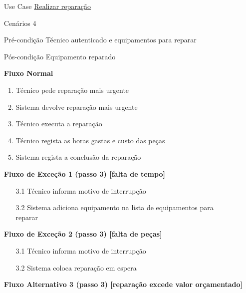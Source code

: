 \documentclass[../relatorio.tex]{subfiles}
\begin{document}
\begin{itemize}
    \item[Use Case] {\underline{Realizar reparação}}
    \item[Cenários] {4}
    \item[Pré-condição] {Técnico autenticado e equipamentos para reparar}
    \item[Pós-condição] {Equipamento reparado}
          \begin{flushleft}
              \textbf{Fluxo Normal}
          \end{flushleft}
          \begin{enumerate}
              \item Técnico pede reparação mais urgente
              \item Sistema devolve reparação mais urgente
              \item Técnico executa a reparação
              \item Técnico regista as horas gastas e custo das peças
              \item Sistema regista a conclusão da reparação
          \end{enumerate}
          \begin{flushleft}
              \textbf{Fluxo de Exceção 1 (passo 3) [falta de tempo]}
          \end{flushleft}
          \begin{itemize}
              \item[3.1]{Técnico informa motivo de interrupção}
              \item[3.2]{Sistema adiciona equipamento na lista de equipamentos para \\
                         reparar}
          \end{itemize}
          \begin{flushleft}
              \textbf{Fluxo de Exceção 2 (passo 3) [falta de peças]}
          \end{flushleft}
          \begin{itemize}
              \item[3.1]{Técnico informa motivo de interrupção}
              \item[ ] 
              \item[3.2]{Sistema coloca reparação em espera}
          \end{itemize}
          \begin{flushleft}
              \textbf{Fluxo Alternativo 3 (passo 3) [reparação excede valor orçamentado]}

\end{flushleft}
\end{itemize}
\end{document}
